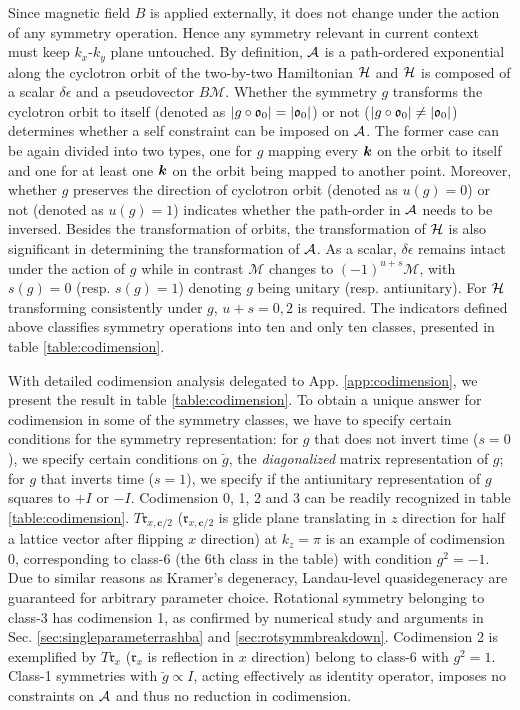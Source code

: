 \documentclass[aps, prb, showpacs, twocolumn, notitlepage, superscriptaddress]{revtex4-1}
\begin{document}
Since magnetic field $B$ is applied externally, it does not change under the action of any symmetry operation. Hence any symmetry relevant in current context must keep $k_x$-$k_y$ plane untouched. By definition, ${\cal A}$ is a path-ordered exponential along the cyclotron orbit of the two-by-two Hamiltonian $\mathcal{H}$ and $\mathcal{H}$ is composed of a scalar $\delta\epsilon$ and a pseudovector $B\mathcal{M}$. Whether the symmetry $g$ transforms the cyclotron orbit to itself (denoted as $|g\circ\mathfrak{o}_0|=|\mathfrak{o}_0|$) or not ($|g\circ\mathfrak{o}_0|\ne|\mathfrak{o}_0|$) determines whether a self constraint can be imposed on ${\cal A}$. The former case can be again divided into two types, one for $g$ mapping every $\boldsymbol{k}$ on the orbit to itself and one for at least one $\boldsymbol{k}$ on the orbit being mapped to another point. Moreover, whether $g$ preserves the direction of cyclotron orbit (denoted as $u(g)=0$) or not (denoted as $u(g)=1$) indicates whether the path-order in ${\cal A}$ needs to be inversed. Besides the transformation of orbits, the transformation of $\mathcal{H}$ is also significant in determining the transformation of ${\cal A}$. As a scalar, $\delta\epsilon$ remains intact under the action of $g$ while in contrast $\mathcal{M}$ changes to $(-1)^{u+s}\mathcal{M}$, with $s(g)=0$ (resp. $s(g)=1$) denoting $g$ being unitary (resp. antiunitary). For $\mathcal{H}$ transforming consistently under $g$, $u+s=0, 2$ is required. The indicators defined above classifies symmetry operations into ten and only ten classes, presented in table \ref{table:codimension}.

With detailed codimension analysis delegated to App. \ref{app:codimension}, we present the result in table \ref{table:codimension}. To obtain a unique answer for codimension in some of the symmetry classes, we have to specify certain conditions for the symmetry representation: for $g$ that does not invert time ($s{=}0$), we specify certain conditions on  $\breve{g}$, the \emph{diagonalized} matrix representation  of $g$; for $g$ that inverts time  ($s{=}1$), we specify if the antiunitary representation of $g$ squares to $+I$ or $-I$.  Codimension 0, 1, 2 and 3 can be readily recognized in table \ref{table:codimension}. $T\mathfrak{r}_{x,\boldsymbol{c}/2}$ ($\mathfrak{r}_{x,\boldsymbol{c}/2}$ is glide plane translating in $z$ direction for half a lattice vector after flipping $x$ direction) at $k_z=\pi$ is an example of codimension 0, corresponding to class-6 (the 6th class in the table)  with condition $g^2=-1$. Due to similar reasons as Kramer's degeneracy, Landau-level quasidegeneracy are guaranteed for arbitrary parameter choice. Rotational symmetry belonging to class-3 has codimension 1, as confirmed by numerical study and arguments in Sec. \ref{sec:singleparameterrashba} and \ref{sec:rotsymmbreakdown}. Codimension 2 is exemplified by $T\mathfrak{r}_x$ ($\mathfrak{r}_x$ is reflection in $x$ direction) belong to class-6 with $g^2=1$. Class-1 symmetries with $\breve{g}\propto I$, acting effectively as identity operator, imposes no constraints on ${\cal A}$ and thus no reduction in codimension.
\end{document}
